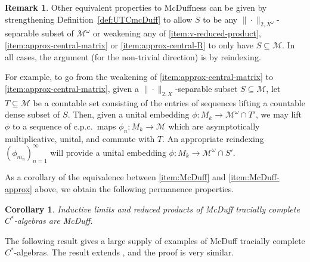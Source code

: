 \documentclass[a4paper,11pt]{amsart}
\newtheorem{corollary}[theorem]{Corollary}
\theoremstyle{definition}
\newtheorem{remark}[theorem]{Remark}
\numberwithin{equation}{section}
\numberwithin{theorem}{section}
\newcommand{\M}{\mathcal{M}}
\begin{document}
\begin{remark}\label{rmk:ultrapower-commutant}
Other equivalent properties to McDuffness can be given by strengthening Definition~\ref{def:UTCmcDuff} to allow $S$ to be any $\|\cdot\|_{2, X^\omega}$-separable subset of $\M^\omega$ or weakening any of \ref{item:v-reduced-product}, \ref{item:approx-central-matrix} or \ref{item:approx-central-R} to only have $S \subseteq \M$.
In all cases, the argument (for the non-trivial direction) is by reindexing.

For example, to go from the weakening of \ref{item:approx-central-matrix} to \ref{item:approx-central-matrix}, given a $\|\cdot\|_{2, X}$-separable subset $S\subseteq \M$, let $T\subseteq \M$ be a countable set consisting of the entries of sequences lifting a countable dense subset of $S$.
Then, given a unital embedding $\phi \colon M_k \to \M^\omega \cap T'$, we may lift $\phi$ to a sequence of c.p.c.\ maps $\phi_n:M_k \to \M$ which are asymptotically multiplicative, unital, and commute with $T$.
An appropriate reindexing $(\phi_{m_n})_{n=1}^\infty$ will provide a unital embedding $\phi\colon M_k \to \M^\omega \cap S'$.
\end{remark}


As a corollary of the equivalence between \ref{item:McDuff} and \ref{item:McDuff-approx} above, we obtain the following permanence properties.

\begin{corollary}\label{cor:McDuff-indlim-ultraproducts}
Inductive limits and reduced products of McDuff tracially complete $C^*$-algebras are McDuff.
\end{corollary}

The following result gives a large supply of examples of McDuff tracially complete $C^*$-algebras.  The result extends \cite[Proposition~2.3]{CETWW}, and the proof is very similar. 
\end{document}
